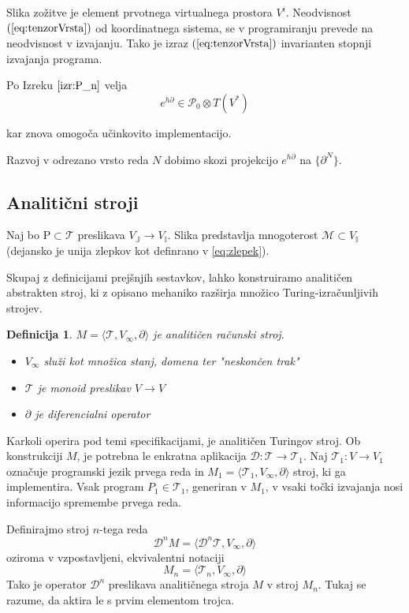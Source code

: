 \documentclass{article}
\newcommand{\II}{\mathbb{I}}
\newcommand{\JJ}{\mathbb{J}}
\newcommand{\T}{\mathcal{T}}
\newcommand{\dP}{\mathcal{P}}
\newcommand{\D}{\partial}
\newcommand{\Dplus}{\mathcal{D}}
\newtheorem{definicija}{Definicija}[section]
\begin{document}
 Slika zožitve je element prvotnega virtualnega prostora $V^i$. Neodvisnost $(\ref{eq:tenzorVrsta})$ od koordinatnega sistema, se v programiranju prevede na neodvisnost v izvajanju. Tako je izraz $(\ref{eq:tenzorVrsta})$ invarianten stopnji izvajanja programa.   
 
 Po Izreku $\ref{izr:P_n}$ velja
     \begin{equation}
     	e^{h\D}\in\dP_0\otimes T(V^*)
     \end{equation}
     
kar znova omogoča učinkovito implementacijo.
 
 Razvoj v odrezano vrsto reda $N$ dobimo skozi projekcijo $e^{h\D}$ na $\{\D^N \}$.
  
\subsection{Analitični stroji}
   
Naj bo $\mathrm{P}\subset\T$ preslikava $V_\JJ\to V_\II$. Slika predstavlja
mnogoterost $\mathcal{M}\subset V_\II$ (dejansko je unija zlepkov kot definrano
v \ref{eq:zlepek}).

  
  Skupaj z definicijami prejšnjih sestavkov, lahko konstruiramo analitičen abstrakten stroj, ki z opisano mehaniko razširja množico Turing-izračunljivih strojev.
  
  \begin{definicija}
   $M=\langle\T, V_\infty, \D\rangle$ je analitičen računski stroj.
   
    \begin{itemize}
    \item
    $V_\infty$ služi kot množica stanj, domena ter "neskončen trak"
    \item
    $\T$ je monoid preslikav $V\to V$
    \item
    $\D$ je diferencialni operator
    \end{itemize}
  \end{definicija}
 
 Karkoli operira pod temi specifikacijami, je analitičen Turingov stroj.
 Ob konstrukciji $M$, je potrebna le enkratna aplikacija $\Dplus: \T\to\T_1$. Naj $\T_1: V\to V_1$ označuje programski jezik prvega reda in $M_1=\langle\T_1, V_\infty, \D\rangle$ stroj, ki ga implementira. Vsak program $P_1\in\T_1$, generiran v $M_1$, v vsaki točki izvajanja nosi informacijo spremembe prvega reda.
 
 Definirajmo stroj $n$-tega reda
 \begin{equation}\label{eq:Mprime}
	 \Dplus^n M=\langle\Dplus^n\T, V_\infty, \D\rangle
 \end{equation}
 oziroma v vzpostavljeni, ekvivalentni notaciji
  \begin{equation}\label{eq:M'}
 	 M_n=\langle\T_n, V_\infty, \D\rangle
  \end{equation}
  Tako je operator $\Dplus^n$ preslikava analitičnega stroja $M$ v stroj $M_n$. Tukaj se razume, da aktira le s prvim elementom trojca.
  
\end{document}
